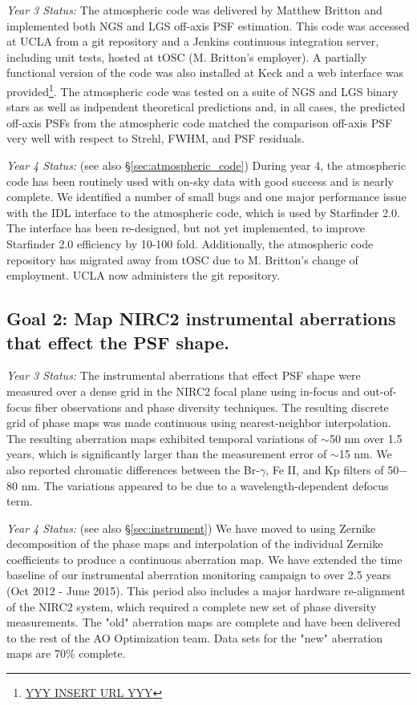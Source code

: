 \noindent
\textit{Year 3 Status:}
The atmospheric code was delivered by Matthew Britton and
implemented both NGS and LGS off-axis PSF estimation. This code was
accessed at UCLA from a git repository and a Jenkins continuous
integration server, including unit tests, hosted at tOSC
(M. Britton's employer). A partially functional version of the code
was also installed at Keck and a web interface was 
provided\footnote{\url{YYY INSERT URL YYY}}.
The atmospheric code was tested on a suite of NGS and LGS
binary stars as well as indpendent theoretical predictions and, in
all cases, the predicted off-axis PSFs from the atmospheric code
matched the comparison off-axis PSF very well with respect to
Strehl, FWHM, and PSF residuals. 

\noindent
\textit{Year 4 Status:} (see also \S\ref{sec:atmospheric_code})
During year 4, the atmospheric code has been routinely used with on-sky data with good success and is nearly complete.
We identified a number of small bugs and one major
performance issue with the IDL interface to the atmospheric code, 
which is used by Starfinder 2.0. The interface has been re-designed, but not yet
implemented, to improve Starfinder 2.0 efficiency by 10-100
fold. Additionally, the atmospheric code repository has migrated away
from tOSC due to M. Britton's change of employment. 
UCLA now administers the git repository.



\subsection{Goal 2:  Map NIRC2 instrumental aberrations that effect the PSF
    shape.}

\noindent 
\textit{Year 3 Status:}
The instrumental aberrations that effect PSF shape were measured over
a dense grid in the NIRC2 focal plane using in-focus and out-of-focus
fiber observations and phase diversity techniques. The resulting
discrete grid of phase maps was made continuous using nearest-neighbor
interpolation. The resulting aberration maps exhibited temporal
variations of $\sim$50 nm over 1.5 years, which is significantly
larger than the measurement error of $\sim$15 nm. We also reported 
chromatic differences between the Br-$\gamma$, Fe \textrm{II}, and Kp
filters of 50$-$80 nm. The variations appeared to be due to a
wavelength-dependent defocus term.
  
\noindent 
\textit{Year 4 Status:} (see also \S\ref{sec:instrument})
We have moved to using Zernike decomposition of the phase maps and 
interpolation of the individual
Zernike coefficients to produce a continuous aberration map. 
We have extended the time baseline of our instrumental aberration
monitoring campaign to over 2.5 years (Oct 2012 - June 2015). This
period also includes a major hardware re-alignment of the NIRC2
system, which required a complete new set of phase diversity
measurements. The "old" aberration maps are complete and have been 
delivered to the rest of the AO Optimization team. Data sets for 
the "new" aberration maps are 70\% complete.

